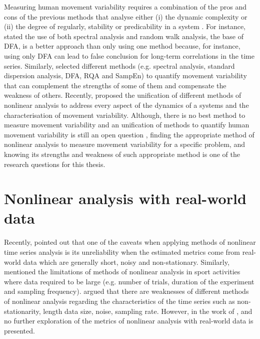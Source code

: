 Measuring human movement variability requires a combination of the 
pros and cons of the previous methods that analyse either 
(i) the dynamic complexity or (ii) the degree of regularly, stability or 
predicability in a system \citep{goldberger2002b, harbourne2009, stergiou2011}.
For instance, \cite{rangarajan2000} stated 
the use of both spectral analysis 
and random walk analysis, the base of DFA, is a better approach than only 
using one method because, for instance, using only DFA can lead to 
false conclusion for long-term correlations in the time series.
Similarly, \cite{wijnants2009} selected different methods 
(e.g. spectral analysis, standard dispersion analysis, DFA, RQA and SampEn) 
to quantify movement variability that can complement the strengths of 
some of them and compensate the weakness of others. 
Recently, \cite{caballero2014} proposed 
the unification of different methods of nonlinear analysis 
to address every aspect of the dynamics 
of a systems and the characterisation of movement variability. 
Although, there is no best method to measure movement variability and an 
unification of methods to quantify human movement variability is still an 
open question \citep{caballero2014}, 
finding the appropriate method of nonlinear analysis 
to measure movement variability for a specific problem, and 
knowing its strengths and weakness of such appropriate method 
is one of the research questions for this thesis. 

\section{Nonlinear analysis with real-world data} \label{nonlieaRealdata} 
Recently, \cite{huffaker2017} pointed out that one of the caveats 
when applying methods of nonlinear time series analysis is its unreliability 
when the estimated metrics come from real-world data which are generally 
short, noisy and non-stationary. Similarly, \cite{preatoni2013} mentioned 
the limitations of methods of nonlinear analysis in sport activities 
where data required to be large (e.g. number of trials, duration of the 
experiment and sampling frequency). 
\cite{caballero2014} argued that there are weaknesses of different 
methods of nonlinear analysis regarding the characteristics 
of the time series such as non-stationarity, length data size, noise, 
sampling rate.
However, in the work of \cite{huffaker2017}, \cite{preatoni2013} and
\cite{caballero2014} no further exploration of the metrics of nonlinear
analysis with real-world data is presented.

